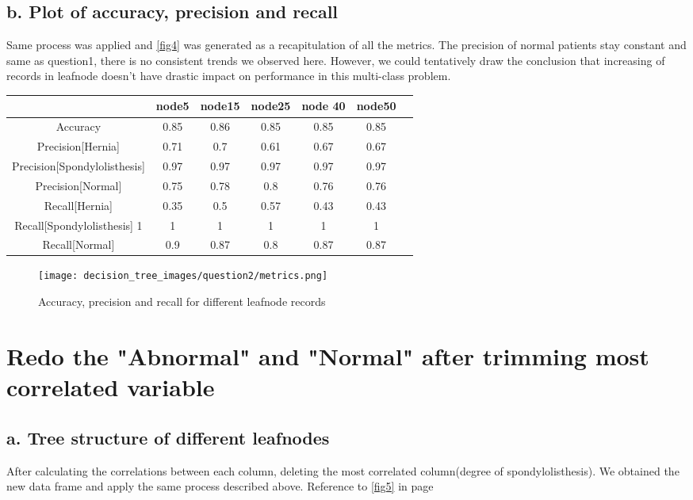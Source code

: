 \documentclass{article}
\begin{document}
\subsection*{b. Plot of accuracy, precision and recall}
Same process was applied and \autoref{fig4} was generated as a recapitulation of all the metrics. The precision of normal patients stay constant and same as question1, there is no consistent trends we observed here. However, we could tentatively draw the conclusion that increasing of records in leafnode doesn't have drastic impact on performance in this multi-class problem.

\begin{center}
    \begin{tabular}{|c|c|c|c|c|c|c|}
    \hline
     & node5 & node15 & node25 &node 40 & node50 \\
    \hline
    Accuracy & 0.85 & 0.86 & 0.85 & 0.85 & 0.85\\
    \hline
    Precision[Hernia] & 0.71 & 0.7 & 0.61 & 0.67 & 0.67\\
    \hline
    Precision[Spondylolisthesis] & 0.97 & 0.97 & 0.97 & 0.97 & 0.97\\
    \hline
    Precision[Normal] &0.75 & 0.78 & 0.8 & 0.76 & 0.76\\
    \hline
    Recall[Hernia] & 0.35 & 0.5 & 0.57 & 0.43 & 0.43\\
    \hline
    Recall[Spondylolisthesis] 1 & 1 & 1 & 1 & 1 & 1\\
    \hline
    Recall[Normal]& 0.9 & 0.87 & 0.8 & 0.87 & 0.87\\
    \hline
    \end{tabular}
\end{center}
\begin{figure}[H]
    \centering
    \texttt{[image: decision\_tree\_images/question2/metrics.png]}
    \caption{Accuracy, precision and recall for different leafnode records}
    \label{fig4}
\end{figure}

\section{Redo the "Abnormal" and "Normal" after trimming most correlated variable}
\subsection*{a. Tree structure of different leafnodes}
After calculating the correlations between each column, deleting the most correlated column(degree of spondylolisthesis). We obtained the new data frame and apply the same process described above. Reference to \autoref{fig5} in page \pageref{fig5}
\end{document}
